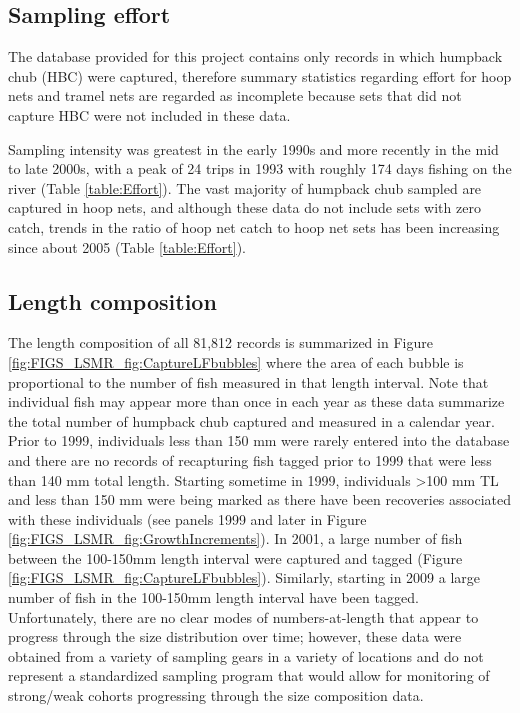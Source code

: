 
\subsection{Sampling effort} %
\label{sub:sampling_effort}
The database provided for this project contains only records in which humpback chub (HBC) were captured, therefore summary statistics regarding effort for hoop nets and tramel nets are regarded as incomplete because sets that did not capture HBC were not included in these data.

Sampling intensity was greatest in the early 1990s and more recently in the mid to late 2000s, with a peak of 24 trips in 1993 with roughly 174 days fishing on the river (Table \ref{table:Effort}).  The vast majority of humpback chub sampled are captured in hoop nets, and although these data do not include sets with zero catch, trends in the ratio of hoop net catch to hoop net sets has been increasing since about 2005 (Table \ref{table:Effort}).





\subsection{Length composition} %
\label{sub:length_composition}

The length composition of all 81,812 records is summarized in Figure \ref{fig:FIGS_LSMR_fig:CaptureLFbubbles} where the area of each bubble is proportional to the number of fish measured in that length interval.  Note that individual fish may appear more than once in each year as these data summarize the total number of humpback chub captured and measured in a calendar year.  Prior to 1999, individuals less than 150 mm were rarely entered into the database and there are no records of recapturing fish tagged prior to 1999 that were less than 140 mm total length.  Starting sometime in 1999, individuals >100 mm TL and less than 150 mm were being marked as there have been recoveries associated with these individuals (see panels 1999 and later in Figure \ref{fig:FIGS_LSMR_fig:GrowthIncrements}).  In 2001, a large number of fish between the 100-150mm length interval were captured and tagged (Figure \ref{fig:FIGS_LSMR_fig:CaptureLFbubbles}).  Similarly, starting in 2009 a large number of fish in the 100-150mm length interval have been tagged.  Unfortunately, there are no clear modes of numbers-at-length that appear to progress through the size distribution over time; however, these data were obtained from a variety of sampling gears in a variety of locations and do not represent a standardized sampling program that would allow for monitoring of strong/weak cohorts progressing through the size composition data.

